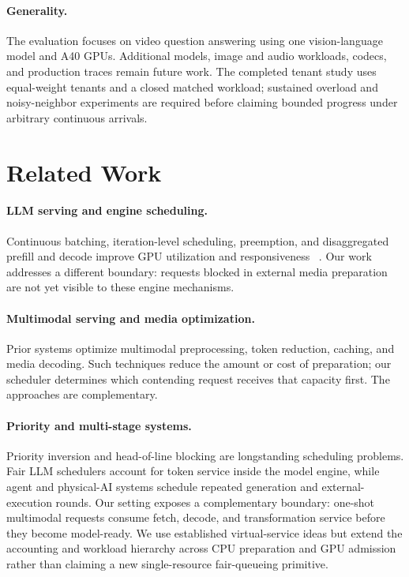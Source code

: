 \documentclass[sigconf,review,anonymous]{acmart}
\begin{document}
\paragraph{Generality.}
The evaluation focuses on video question answering using one vision-language
model and A40 GPUs. Additional models, image and audio workloads, codecs, and
production traces remain future work. The completed tenant study uses
equal-weight tenants and a closed matched workload; sustained overload and
noisy-neighbor experiments are required before claiming bounded progress
under arbitrary continuous arrivals.

\section{Related Work}

\paragraph{LLM serving and engine scheduling.}
Continuous batching, iteration-level scheduling, preemption, and disaggregated
prefill and decode improve GPU utilization and responsiveness
~\cite{vllm,fastserve,andes,sarathiserve,distserve}. Our work addresses a
different boundary: requests blocked in external media preparation are not
yet visible to these engine mechanisms.

\paragraph{Multimodal serving and media optimization.}
Prior systems optimize multimodal preprocessing, token reduction, caching,
and media decoding. Such techniques reduce the amount or cost of preparation;
our scheduler determines which contending request receives that capacity
first. The approaches are complementary.

\paragraph{Priority and multi-stage systems.}
Priority inversion and head-of-line blocking are longstanding scheduling
problems. Fair LLM schedulers account for token service inside the model
engine, while agent and physical-AI systems schedule repeated generation and
external-execution rounds. Our setting exposes a complementary boundary:
one-shot multimodal requests consume fetch, decode, and transformation service
before they become model-ready. We use established virtual-service ideas but
extend the accounting and workload hierarchy across CPU preparation and GPU
admission rather than claiming a new single-resource fair-queueing primitive.
\end{document}
